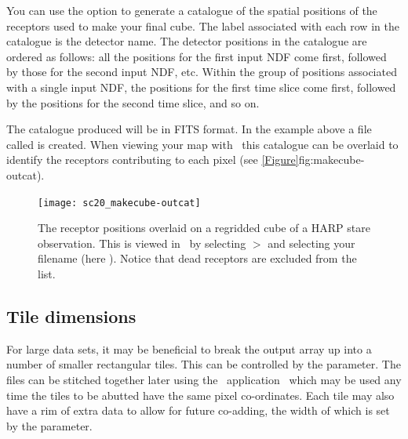 \documentclass[11pt,oneside,chapters]{starlink}
\begin{document}
You can use the option  to generate a catalogue of the
spatial positions of the receptors used to make your final cube. The
label associated with each row in the catalogue is the detector name.
The detector positions in the catalogue are ordered as follows: all
the positions for the first input NDF come first, followed by those
for the second input NDF, etc. Within the group of positions
associated with a single input NDF, the positions for the first time
slice come first, followed by the positions for the second time slice,
and so on.

\begin{terminalv}
\end{terminalv}

The catalogue produced will be in FITS format. In the example above a
file called  is created. When viewing your map with \gaia\ this
catalogue can be overlaid to identify the receptors contributing to
each pixel (see \cref{Figure}{fig:makecube-outcat}{}).

\begin{figure}[h!]
\begin{center}
\texttt{[image: sc20\_makecube-outcat]}
\caption[Displaying receptor positions in \gaia.]{\label{fig:makecube-outcat}
  The receptor positions overlaid on a regridded cube of a HARP stare
  observation. This is viewed in \gaia\ by selecting
   $>$  and selecting
  your  filename (here ). Notice that dead
  receptors are excluded from the list.}
\end{center}
\end{figure}

\subsection{Tile dimensions}

For large data sets, it may be beneficial to break the output array up
into a number of smaller rectangular tiles. This can be controlled by
the  parameter.  The files can be stitched together
later using the \Kappa\ application \paste\ which may be used any time
the tiles to be abutted have the same pixel co-ordinates.  Each tile
may also have a rim of extra data to allow for future co-adding,
the width of which is set by the  parameter.


\clearpage
\end{document}
